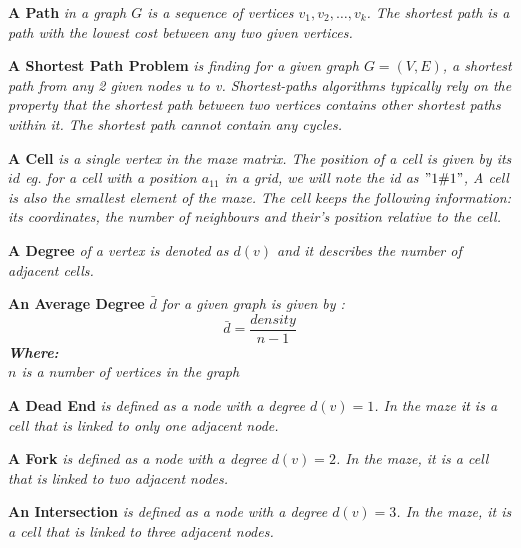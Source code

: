 \begin{definition}\textbf{A Path } \emph{in a graph $G$ is a sequence of vertices $v_1, v_2,\ldots,v_k$. The shortest path is a path with the lowest cost between any two given vertices.\cite{Erickson}}\end{definition}
\begin{definition}\textbf{A Shortest Path Problem } \emph{is finding for a given graph $G = (V,E)$, a shortest path from any 2 given nodes \textit{u} to \textit{v}. Shortest-paths algorithms typically rely on the property that the shortest path between two vertices contains other shortest paths within it.
The shortest path cannot contain any cycles.\cite{Trudeau}}\end{definition}
\begin{definition}\textbf{A Cell} \emph{is a single vertex in the maze matrix. The position of a cell is given by its $id$ eg. for a cell with a position $a_{11}$ in a grid, we will note the id as $"1\char"0023 1"$, A cell is also the smallest element of the maze. The cell keeps the following information: its coordinates, the number of neighbours and their’s position relative to the cell.}\end{definition}
\begin{definition}\textbf{A Degree } \emph{of a vertex is denoted as $d(v)$ and it describes the number of adjacent cells.\cite{Hofstad}}\end{definition}
\begin{definition}\textbf{An Average Degree }\emph{ $\bar{d}$ for a given graph is given by \cite{Hofstad}:\\
\begin{equation}
\bar{d} = \frac{density}{n-1}	
\end{equation}
\textbf{Where:}\\
$n$ is a number of vertices in the graph\\	
}\end{definition}
\begin{definition}\textbf{A Dead End} \emph{ is defined as a node with a degree $d(v) = 1$. In the maze \textcolor{black}{it is} a cell that is linked to only one adjacent node.}\end{definition}
\begin{definition}\textbf{A Fork} \emph{is defined as a node with a degree $d(v) = 2$. In the maze, it is a cell that is linked to two adjacent nodes.}\end{definition}
\begin{definition}\textbf{An Intersection} \emph{ is defined as a node with a degree $d(v) = 3$. In the maze, it is a cell that is linked to three adjacent nodes.}\end{definition}
